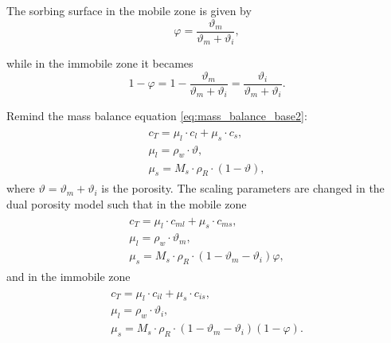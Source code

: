The sorbing surface in the mobile zone is given by
\begin{equation}
  \varphi = \frac{\vartheta_m}{\vartheta_m + \vartheta_i}, 
\end{equation}

while in the immobile zone it becames
\[ 1 - \varphi = 1-\frac{\vartheta_m}{\vartheta_m + \vartheta_i} = \frac{\vartheta_i}{\vartheta_m + \vartheta_i}. \]

Remind the mass balance equation \eqref{eq:mass_balance_base2}:
\begin{eqnarray}
 \begin{array}{l}
  c_T = \mu_l\cdot c_l + \mu_s\cdot c_s,\\
  \mu_l = \rho_w \cdot \vartheta, \\
  \mu_s = M_s \cdot\rho_R\cdot(1-\vartheta),
 \end{array}
 \label{eq:scale_params}
\end{eqnarray}
where $\vartheta = \vartheta_m + \vartheta_i$ is the porosity.
The scaling parameters are changed in the dual porosity model such that in the mobile zone
\begin{eqnarray}
 \begin{array}{l}
  c_T = \mu_l\cdot c_{ml} + \mu_s\cdot c_{ms},\\
  \mu_l = \rho_w \cdot \vartheta_m, \\
  \mu_s = M_s \cdot\rho_R\cdot(1-\vartheta_m - \vartheta_i)\varphi,
 \end{array}
 \label{eq:scale_params_m}
\end{eqnarray}
and in the immobile zone
\begin{eqnarray}
 \begin{array}{l}
  c_T = \mu_l\cdot c_{il} + \mu_s\cdot c_{is},\\
  \mu_l = \rho_w \cdot \vartheta_i, \\
  \mu_s = M_s \cdot\rho_R\cdot(1-\vartheta_m - \vartheta_i)(1 - \varphi).
 \end{array}
 \label{eq:scale_params_i}
\end{eqnarray}

